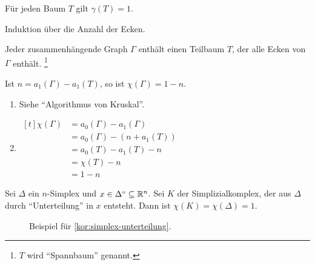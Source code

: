 \begin{bemerkung}
    Für jeden Baum $T$ gilt $\gamma(T) = 1$.
\end{bemerkung}

\begin{beweis}
    Induktion über die Anzahl der Ecken.
\end{beweis}

\begin{bemerkung}
    \begin{bemenum}
        \item Jeder zusammenhängende Graph $\Gamma$ enthält einen
              Teilbaum $T$, der alle Ecken von $\Gamma$ enthält.%
              \footnote{$T$ wird \enquote{Spannbaum} genannt.}
        \item Ist $n = a_1(\Gamma) - a_1(T)$, so ist $\chi(\Gamma) = 1 - n$.
    \end{bemenum}
\end{bemerkung}

\begin{beweis}\leavevmode
    \begin{enumerate}[label=\alph*),ref=\thedefinition.\alph*]
        \item Siehe \enquote{Algorithmus von Kruskal}.
        \item $\begin{aligned}[t]\chi(\Gamma) &= a_0(\Gamma) - a_1(\Gamma)\\
                                        &= a_0(\Gamma) - (n+a_1(T))\\
                                        &= a_0(T) - a_1(T) - n\\
                                        &= \chi(T) - n\\
                                        &= 1-n
              \end{aligned}$
    \end{enumerate}
\end{beweis}

\begin{bemerkung}\label{kor:simplex-unterteilung}
    Sei $\Delta$ ein $n$-Simplex und $x \in \Delta^\circ \subseteq \mathbb{R}^n$.
    Sei $K$ der Simplizialkomplex, der aus $\Delta$ durch 
    \enquote{Unterteilung} in $x$ entsteht. Dann ist $\chi(K) = \chi(\Delta) = 1$.
\end{bemerkung}

\begin{figure}[ht]
    \centering
    \subfloat[$K$]{
        \parbox{4cm}{\centering}
        \label{fig:topology-simplizial-complex-k}
    }%
    \caption{Beispiel für \cref{kor:simplex-unterteilung}.}
    \label{fig:simplex-unterteilung-beispiel}
\end{figure}

